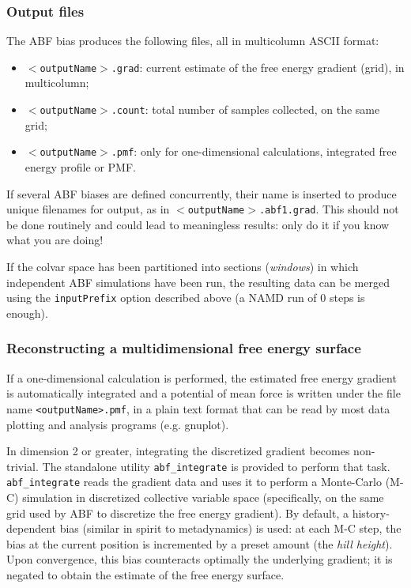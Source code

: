 \subsubsection*{Output files}

The ABF bias produces the following files, all in multicolumn ASCII format:
\begin{itemize}
\item \texttt{$<$outputName$>$.grad}: current estimate of the free energy gradient (grid),
  in multicolumn;
\item \texttt{$<$outputName$>$.count}: total number of samples collected, on the same grid;
\item \texttt{$<$outputName$>$.pmf}: only for one-dimensional calculations, integrated
  free energy profile or PMF.
\end{itemize}

If several ABF biases are defined concurrently, their name is inserted to produce
unique filenames for output, as in \texttt{$<$outputName$>$.abf1.grad}.
This should not be done routinely and could lead to meaningless results:
only do it if you know what you are doing!

If the colvar space has been partitioned into sections (\emph{windows}) in which independent
ABF simulations have been run, the resulting data can be merged using the
\texttt{inputPrefix} option described above (a NAMD run of 0 steps is enough).

\subsubsection*{Reconstructing a multidimensional free energy surface}

If a one-dimensional calculation is performed, the estimated free energy
gradient is automatically integrated and a potential of mean force is written
under the file name \texttt{<outputName>.pmf}, in a plain text format that
can be read by most data plotting and analysis programs (e.g. gnuplot).

In dimension 2 or greater, integrating the discretized gradient becomes non-trivial. The
standalone utility \texttt{abf\_integrate} is provided to perform that task.
\texttt{abf\_integrate} reads the gradient data and uses it to perform a Monte-Carlo (M-C)
simulation in discretized collective variable space (specifically, on the same grid
used by ABF to discretize the free energy gradient).
By default, a history-dependent bias (similar in spirit to metadynamics) is used:
at each M-C step, the bias at the current position is incremented by a preset amount
(the \emph{hill height}).
Upon convergence, this bias counteracts optimally the underlying gradient;
it is negated to obtain the estimate of the free energy surface.


